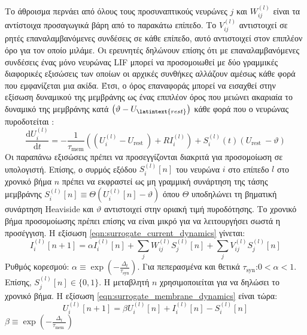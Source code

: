 \documentclass[12pt]{report}
\begin{document}
Tο άθροισμα περνάει από όλους τους προσυναπτικούς νευρώνες $j$ και $W_{i j}^{(l)}$ είναι τα αντίστοιχα προσαγωγικά βάρη από το παρακάτω επίπεδο. Το $V_{i j}^{(l)}$ αντιστοιχεί σε ρητές επαναλαμβανόμενες συνδέσεις σε κάθε επίπεδο, αυτό αντιστοιχεί στον επιπλέον όρο για τον οποίο μιλάμε. Οι ερευνητές δηλώνουν επίσης ότι με επαναλαμβανόμενες συνδέσεις ένας μόνο νευρώνας \textlatin{LIF} μπορεί να προσομοιωθεί με δύο γραμμικές διαφορικές εξισώσεις των οποίων οι αρχικές συνθήκες αλλάζουν αμέσως κάθε φορά που εμφανίζεται μια ακίδα. Έτσι, ο όρος επαναφοράς μπορεί να εισαχθεί στην εξίσωση δυναμικού της μεμβράνης ως ένας επιπλέον όρος που μειώνει ακαριαία το δυναμικό της μεμβράνης κατά $\left(\vartheta-U_{\latintext {rest }}\right)$ κάθε φορά που ο νευρώνας πυροδοτείται :
\begin{equation}
\label{eqn:surrogate_membrane_dynamics}
\frac{\mathrm{d} U_{i}^{(l)}}{\mathrm{d} t}=-\frac{1}{\tau_{\mathrm{mem}}}\left(\left(U_{i}^{(l)}-U_{\text {rest }}\right)+R I_{i}^{(l)}\right)+S_{i}^{(l)}(t)\left(U_{\text {rest }}-\vartheta\right)
\end{equation}
Οι παραπάνω εξισώσεις πρέπει να προσεγγίζονται διακριτά για προσομοίωση σε υπολογιστή. Επίσης, ο συρμός εξόδου $S_{i}^{(l)}[n]$ του νευρώνα $i$ στο επίπεδο $l$ στο χρονικό βήμα $n$ πρέπει να εκφραστεί ως μη γραμμική συνάρτηση της τάσης μεμβράνης $S_{i}^{(l)}[n] \equiv \Theta\left(U_{i}^{(l)}[n]-\vartheta\right)$ όπου $\Theta$ υποδηλώνει τη βηματική συνάρτηση \textlatin{Heaviside} και $\vartheta$ αντιστοιχεί στην οριακή τιμή πυροδότησης. Το χρονικό βήμα προσομοίωσης πρέπει επίσης να είναι μικρό για να λειτουργήσει σωστά η προσέγγιση. Η εξίσωση \ref{eqn:surrogate_current_dynamics} γίνεται:
\begin{equation}
I_{i}^{(l)}[n+1]=\alpha I_{i}^{(l)}[n]+\sum_{j} W_{i j}^{(l)} S_{j}^{(l)}[n]+\sum_{j} V_{i j}^{(l)} S_{j}^{(l)}[n]
\end{equation}
Ρυθμός κορεσμού: $\alpha \equiv \exp \left(-\frac{\Delta_{t}}{\tau_{\mathrm{syn}}}\right) .$  Για πεπερασμένα και θετικά $\tau_{\mathrm{syn}}$:$0<\alpha<1$. Επίσης, $S_{j}^{(l)}[n] \in\{0,1\} .$ Η μεταβλητή $n$ χρησιμοποιείται για να δηλώσει το χρονικό βήμα. Η εξίσωση \ref{eqn:surrogate_membrane_dynamics} είναι τώρα:
\begin{equation}
U_{i}^{(l)}[n+1]=\beta U_{i}^{(l)}[n]+I_{i}^{(l)}[n]-S_{i}^{(l)}[n]
\end{equation}
$\beta \equiv \exp \left(-\frac{\Delta_{t}}{\tau_{\text {mem }}}\right)$
\end{document}
